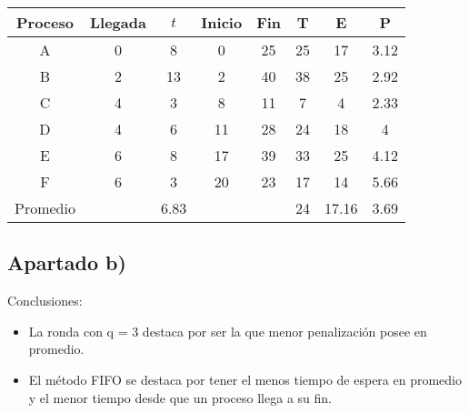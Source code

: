 \documentclass[11pt]{article}
\begin{document}
\begin{center}
    \begin{tabular}{|c|c|c|c|c|c|c|c|}
        \hline
        Proceso & Llegada & $t$ & Inicio & Fin & T & E & P \\
        \hline
        A & 0 & 8 & 0 & 25 & 25 & 17 & 3.12 \\
        \hline
        B & 2 & 13 & 2 & 40 & 38 & 25 & 2.92 \\
        \hline
        C & 4 & 3 & 8 & 11 & 7 & 4 & 2.33 \\
        \hline
        D & 4 & 6 & 11 & 28 & 24 & 18 & 4 \\
        \hline
        E & 6 & 8 & 17 & 39 & 33 & 25 & 4.12 \\
        \hline
        F & 6 & 3 & 20 & 23 & 17 & 14 & 5.66 \\ 
        \hline
        Promedio & & 6.83 & & & 24 & 17.16 & 3.69 \\
        \hline
    \end{tabular}
\end{center}

\subsection*{Apartado b)}

Conclusiones:

\begin{itemize}
    \item La ronda con q = 3 destaca por ser la que menor
          penalización posee en promedio.
    \item El método FIFO se destaca por tener el menos tiempo de espera en promedio
          y el menor tiempo desde que un proceso llega a su fin. 
\end{itemize}
\end{document}
